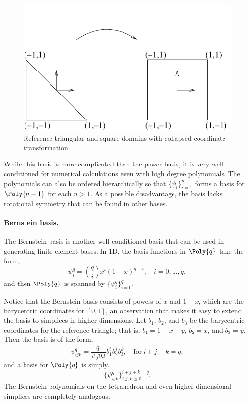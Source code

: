 \begin{figure}
  \centering
  \includegraphics[width=\largefig]{chapters/kirby-1/pdf/tricoord.pdf}
  \caption{Reference triangular and square domains with collapsed
    coordinate transformation.}
  \label{fig:tricoord}
\end{figure}

While this basis is more complicated than the power basis, it is
very well-conditioned for numerical calculations even with high degree
polynomials.  The polynomials can also be ordered hierarchically so that
$\{ \psi_i \}_{i=1}^{n}$ forms a basis for $\Poly{n-1}$ for each $n >
1$.  As a possible disadvantage, the basis lacks rotational symmetry
that can be found in other bases.

\paragraph{Bernstein basis.}
The Bernstein basis is another well-conditioned basis that can be used
in generating finite element bases.  In 1D, the basis functions in $\Poly{q}$
take the form,
\begin{equation}
\psi_i^q = \binom{q}{i} x^i (1-x)^{q-i}, \quad i=0,\ldots,q,
\end{equation}
and then $\Poly{q}$ is spanned by $\{ \psi_i^q \}_{i=0}^q$.

Notice that the Bernstein basis consists of powers of $x$ and
$1-x$, which are the barycentric coordinates for $[0,1]$,
an observation that makes it easy to extend the basis to simplices
in higher dimensions.  Let $b_1$, $b_2$, and $b_3$ be the barycentric
coordinates for the reference triangle; that is, $b_1=1-x-y$, $b_2=x$,
and $b_3=y$. Then the basis is of the form,
\begin{equation}
\psi_{ijk}^q = \frac{q!}{i!j!k!} b_1^i b_2^j b_3^k, \quad  \mbox{for} \ i+j+k=q,
\end{equation}
and a basis for $\Poly{q}$ is simply.
\begin{equation}
\{ \psi_{ijk}^q \}_{i,j,k\geqslant 0}^{i+j+k = q} .
\end{equation}
The Bernstein polynomials on the tetrahedron and even higher dimensional
simplices are completely analogous.

